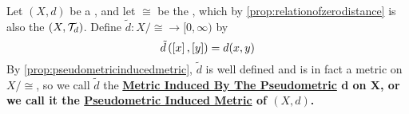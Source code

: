 
\newcommand{\PseudometricInducedMetric}[0]{
    \bf \hyperref[def:pseudometricinducedmetric]{Pseudometric Induced Metric} \rm
}
\newcommand{\MetricInducedByPseudometric}[0]{
    \bf \hyperref[def:pseudometricinducedmetric]{Metric Induced By The Pseudometric} \rm
}
\begin{df}
    \label{def:pseudometricinducedmetric}
    Let $(X,d)$ be a \PseudometricSpace, and let $\cong$ be the \RelationOfZeroDistance, which by \ref{prop:relationofzerodistance} is also the \RelationOfEqualNeighborhoodFilters $(X,\mathcal{T}_d)$. 
    Define $\tilde{d}: X/\cong \to [0,\infty)$ by 
    \begin{equation}
        \tilde{d}\left( \left[ x \right], \left[ y \right]\right) = d(x,y)
    \end{equation}
    By \ref{prop:pseudometricinducedmetric}, $\tilde{d}$ is well defined and is in fact a metric on $X/\cong$, so we call $\tilde{d}$ the \MetricInducedByPseudometric d on X, or we call it the \PseudometricInducedMetric of $(X,d)$. 
\end{df}
